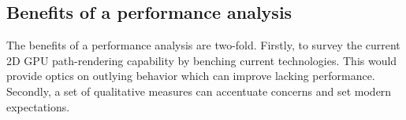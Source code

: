 \subsection{Benefits of a performance analysis}

The benefits of a performance analysis are two-fold. Firstly, to survey the current 2D GPU path-rendering capability by benching current technologies. This would provide optics on outlying behavior which can improve lacking performance. Secondly, a set of qualitative measures can accentuate concerns and set modern expectations.
